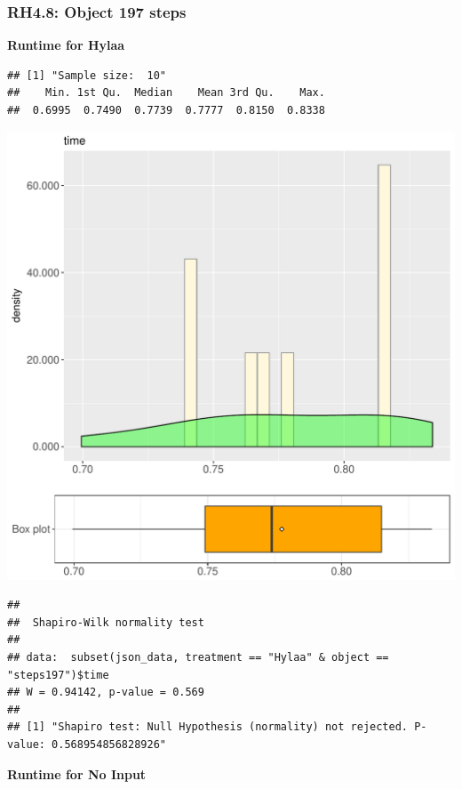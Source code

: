 \documentclass{article}\usepackage[]{graphicx}\usepackage[]{color}
\makeatletter
\def\maxwidth{ %
  \ifdim\Gin@nat@width>\linewidth
    \linewidth
  \else
    \Gin@nat@width
  \fi
}
\newenvironment{kframe}{%
 \def\at@end@of@kframe{}%
 \ifinner\ifhmode%
  \def\at@end@of@kframe{\end{minipage}}%
  \begin{minipage}{\columnwidth}%
 \fi\fi%
 \def\FrameCommand##1{\hskip\@totalleftmargin \hskip-\fboxsep
 \colorbox{shadecolor}{##1}\hskip-\fboxsep
     \hskip-\linewidth \hskip-\@totalleftmargin \hskip\columnwidth}%
 \MakeFramed {\advance\hsize-\width
   \@totalleftmargin\z@ \linewidth\hsize
   \@setminipage}}%
 {\par\unskip\endMakeFramed%
 \at@end@of@kframe}
\newenvironment{knitrout}{}{} %
\makeatother
\begin{document}
\subsubsection{RH4.8: Object 197 steps}

 \textbf{Runtime for Hylaa}
\begin{knitrout}
\color{fgcolor}\begin{kframe}
\begin{verbatim}
## [1] "Sample size:  10"
##    Min. 1st Qu.  Median    Mean 3rd Qu.    Max. 
##  0.6995  0.7490  0.7739  0.7777  0.8150  0.8338
\end{verbatim}
\end{kframe}
\includegraphics[width=\maxwidth]{figure/RH4_Hylaa_steps197-1} 
\begin{kframe}\begin{verbatim}
## 
## 	Shapiro-Wilk normality test
## 
## data:  subset(json_data, treatment == "Hylaa" & object == "steps197")$time
## W = 0.94142, p-value = 0.569
## 
## [1] "Shapiro test: Null Hypothesis (normality) not rejected. P-value: 0.568954856828926"
\end{verbatim}
\end{kframe}
\end{knitrout}
 \textbf{Runtime for No Input}
\end{document}

